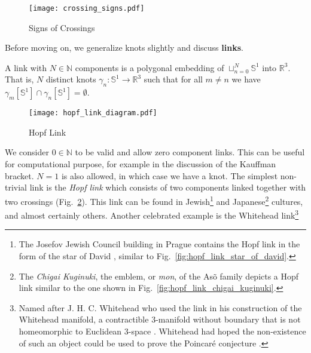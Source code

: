     \begin{figure}
        \centering
        \texttt{[image: crossing\_signs.pdf]}
        \caption{Signs of Crossings}
        \label{fig:crossing_signs}
    \end{figure}
    \par\hfill\par
    Before moving on, we generalize knots slightly and discuss \textbf{links}.
    \begin{definition}
        A link with $N\in\mathbb{N}$ components is a polygonal embedding of
        $\sqcup_{n=0}^{N}\mathbb{S}^{1}$ into $\mathbb{R}^{3}$.
        That is, $N$ distinct knots
        $\gamma_{n}:\mathbb{S}^{1}\rightarrow\mathbb{R}^{3}$ such that for all
        $m\ne{n}$ we have
        $\gamma_{m}[\mathbb{S}^{1}]\cap\gamma_{n}[\mathbb{S}^{1}]=\emptyset$.
    \end{definition}
    \begin{figure}
        \centering
        \texttt{[image: hopf\_link\_diagram.pdf]}
        \caption{Hopf Link}
        \label{fig:hopf_link_diagram}
    \end{figure}
    We consider $0\in\mathbb{N}$ to be valid and allow zero component links.
    This can be useful for computational purpose, for example in the discussion
    of the Kauffman bracket. $N=1$ is also allowed, in which case we have a
    knot. The simplest non-trivial link is the \textit{Hopf link} which consists
    of two components linked together with two crossings
    (Fig.~\ref{fig:hopf_link_diagram}). This link can be found in
    Jewish\footnote{%
        The Josefov Jewish Council building in Prague contains the
        Hopf link in the form of the star of David \cite{KatlasHopfLink},
        similar to Fig.~\ref{fig:hopf_link_star_of_david}.
    }
    and Japanese\footnote{%
        The \textit{Chigai Kuginuki}, the emblem, or \textit{mon},
        of the As\~{o} family depicts a Hopf link \cite{KatlasHopfLink}
        similar to the one shown in Fig.~\ref{fig:hopf_link_chigai_kuginuki}.
    }
    cultures, and almost certainly others. Another celebrated example is
    the Whitehead link\footnote{%
        Named after J. H. C. Whitehead who used the link in his
        construction of the Whitehead
        manifold, a contractible 3-manifold without boundary that is not
        homeomorphic to Euclidean 3-space \cite{WhiteheadManifold}.
        Whitehead had hoped the non-existence of such an object could be
        used to prove the Poincar\'{e} conjecture
        \cite{WhiteheadPoincareConjecture}.
    }
